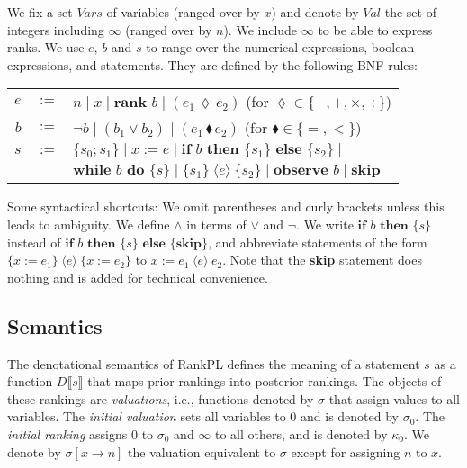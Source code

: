 \documentclass{llncs}
\newcommand{\vars}{\textit{Vars}}
\newcommand{\values}{\textit{Val}}
\newcommand{\dn}[1]{D\llbracket #1 \rrbracket}
\newcommand{\Rank}[1]{\hspace{3pt} \pmb{\langle} #1 \pmb{\rangle}\hspace{3pt} } %
\newcommand{\areth}{\lozenge}
\newcommand{\comp}{\blacklozenge}
\begin{document}
We fix a set $\vars$ of variables (ranged over by $x$) and denote by $\values$ the set of integers including $\infty$ (ranged over by $n$).
We include $\infty$ to be able to express ranks.
We use $e$, $b$ and $s$ to range over the numerical expressions, boolean expressions, and statements.
They are defined by the following BNF rules:
\noindent \begin{center}
\begin{tabular}{rcl}
$\textit{e}$	& $:=$ 	& $n \mid x \mid \textbf{rank }b \mid (e_1 \hspace{2pt} \areth \hspace{2pt} e_2)$ (for $\areth \in \{ -, +, \times, \div \}$)\\

$\textit{b}$	& $:=$ 	& $\neg b \mid (b_1 \vee b_2) \mid (e_1 \hspace{2pt} \comp \hspace{2pt} e_2)$ (for $\comp \in \{ =, < \}$)\\

$\textit{s}$		& $:=$ 	& $\{s_0; s_1 \} \mid x := e \mid \textbf{if }b\textbf{ then }\{ s_1 \}\textbf{ else } \{ s_2 \} \mid $\\
			& 		& $\textbf{while } b \textbf{ do } \{ s \} \mid \{ s_1 \} \Rank{e} \{ s_2 \} \mid \textbf{observe }b \mid \textbf{skip}$\\
\end{tabular}
\end{center}
Some syntactical shortcuts: 
We omit parentheses and curly brackets unless this leads to ambiguity.
We define $\wedge$ in terms of $\vee$ and $\neg$.
We write $\textbf{if }b\textbf{ then } \{ s \}$ instead of $\textbf{if }b\textbf{ then } \{ s \}$ $\textbf{else }\{\textbf{skip}\}$,
	and abbreviate statements of the form $\{x := e_1\} \Rank{e} \{x := e_2\}$ to $x := e_1 \Rank{e} e_2$.
Note that the \textbf{skip} statement does nothing and is added for technical convenience.

\subsection{Semantics}
\label{sec:formalsemantics}

The denotational semantics of RankPL defines the meaning of a statement $s$ as a function $\dn{s}$ that maps prior rankings into posterior rankings.
The objects of these rankings are \emph{valuations}, i.e., functions denoted by $\sigma$ that assign values to all variables.
The \emph{initial valuation} sets all variables to 0 and is denoted by $\sigma_0$.
The \emph{initial ranking} assigns 0 to $\sigma_0$ and $\infty$ to all others, and is denoted by $\kappa_0$.
We denote by $\sigma[x \rightarrow n]$ the valuation equivalent to $\sigma$ except for assigning $n$ to $x$.
\end{document}
